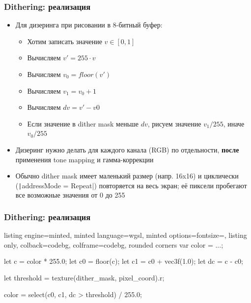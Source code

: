 \documentclass[10pt]{beamer}
\begin{document}
\begin{frame}[fragile]
\frametitle{Dithering: реализация}
\begin{itemize}
\item Для дизеринга при рисовании в 8-битный буфер:
\begin{itemize}
\item Хотим записать значение \begin{math}v \in [0, 1]\end{math}
\item Вычисляем \begin{math}v' = 255 \cdot v\end{math}
\item Вычисляем \begin{math}v_0 = floor(v')\end{math}
\item Вычисляем \begin{math}v_1 = v_0 + 1\end{math}
\item Вычисляем \begin{math}dv = v' - v0\end{math}
\item Если значение в dither mask меньше \begin{math}dv\end{math}, рисуем значение \begin{math}v_1 / 255\end{math}, иначе \begin{math}v_0 / 255\end{math}
\end{itemize}
\pause
\item Дизеринг нужно делать для каждого канала (RGB) по отдельности, \textbf{после} применения tone mapping и гамма-коррекции
\pause
\item Обычно dither mask имеет маленький размер (напр. 16x16) и циклически (\texttt|addressMode = Repeat|) повторяется на весь экран; её пиксели пробегают все возможные значения от 0 до 255
\end{itemize}
\end{frame}

\begin{frame}[fragile]
\frametitle{Dithering: реализация}
\begin{tcblisting}{listing engine=minted, minted language=wgsl, minted options={fontsize=\scriptsize}, listing only, colback=codebg, colframe=codebg, rounded corners}
var color = ...;

let c = color * 255.0;
let c0 = floor(c);
let c1 = c0 + vec3f(1.0);
let dc = c - c0;

let threshold = texture(dither_mask, pixel_coord).r;

color = select(c0, c1, dc > threshold) / 255.0;
\end{tcblisting}
\end{frame}
\end{document}
